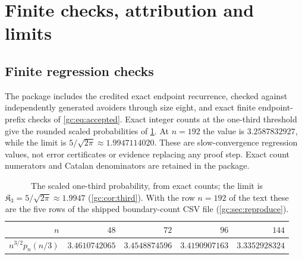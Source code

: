 \documentclass[11pt,a4paper]{article}
\theoremstyle{definition}\newaliascnt{definition}{theorem}
\theoremstyle{remark}\newaliascnt{remark}{theorem}
\begin{document}
\section{Finite checks, attribution and limits}
\label{gc:sec:checks}

\subsection{Finite regression checks}
\label{gc:sec:finite}
The package includes the credited exact endpoint recurrence, checked against
independently generated avoiders through size eight, and exact finite
endpoint-prefix checks of \eqref{gc:eq:accepted}. Exact integer counts at the
one-third threshold give the rounded scaled probabilities of
\cref{gc:tab:finite}. At $n=192$ the value is $3.2587832927$, while the limit
is $5/\sqrt{2\pi}\approx1.9947114020$. These are slow-convergence regression
values, not error certificates or evidence replacing any proof step. Exact
count numerators and Catalan denominators are retained in the package.

\begin{table}[htbp]
\centering
\begin{tabular}{rrrrr}\toprule
$n$ & $48$ & $72$ & $96$ & $144$\\\midrule
$n^{3/2}p_n(n/3)$ & $3.4610742065$ & $3.4548874596$ & $3.4190907163$ & $3.3352928324$\\\bottomrule
\end{tabular}
\caption{The scaled one-third probability, from exact counts; the limit is
$\mathfrak K_3=5/\sqrt{2\pi}\approx1.9947$ (\cref{gc:cor:third}). With the
row $n=192$ of the text these are the five rows of the shipped
boundary-count CSV file (\cref{gc:sec:reproduce}).}
\label{gc:tab:finite}
\end{table}
\end{document}
